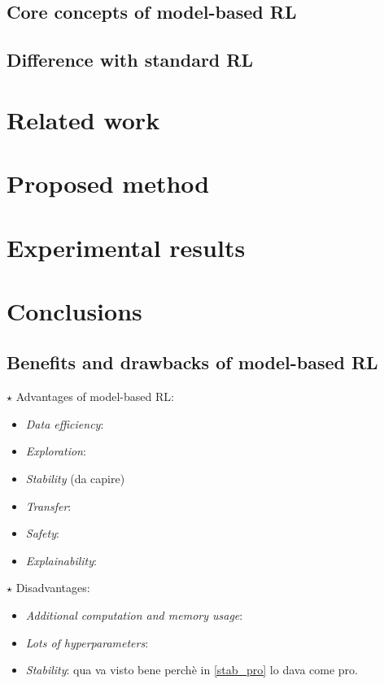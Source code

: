 \documentclass{article}
\begin{document}
 	\subsection{Core concepts of model-based RL}
 	
 	
 	\subsection{Difference with standard RL}


\section{Related work}

\cite{moerland2021modelbased}


\section{Proposed method}


\section{Experimental results}


\section{Conclusions}

	\subsection{Benefits and drawbacks of model-based RL}
		
		$\star$ Advantages of model-based RL:
		\begin{itemize}
  			\item \emph{Data efficiency}:
  			\item \emph{Exploration}:
  			\item \emph{Stability} (da capire) \label{stab_pro}
  			\item \emph{Transfer}:
  			\item \emph{Safety}:
  			\item \emph{Explainability}:
		\end{itemize}
		$\star$ Disadvantages:
		\begin{itemize}
  			\item \emph{Additional computation and memory usage}:
  			\item \emph{Lots of hyperparameters}:
  			\item \emph{Stability}: qua va visto bene perchè in \ref{stab_pro} lo dava come pro.
		\end{itemize}
	
\end{document}

